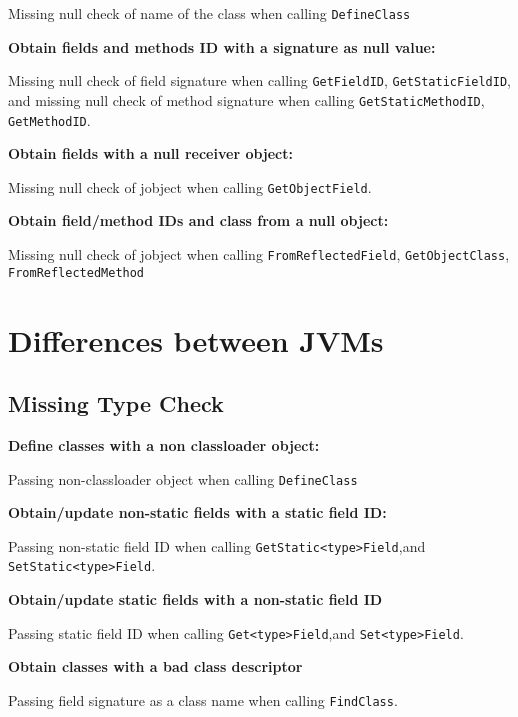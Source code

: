 \documentclass[10pt]{article}
\begin{document}
Missing null check of name of the class when calling {\tt DefineClass}

\vspace{3mm}
\noindent \textbf{Obtain fields and methods ID with a signature as null value:}

Missing null check of field signature when calling {\tt GetFieldID}, {\tt GetStaticFieldID}, and
missing null check of method signature when calling {\tt GetStaticMethodID}, {\tt GetMethodID}.

\vspace{3mm}
\noindent \textbf{Obtain fields with a null receiver object:}

Missing null check of jobject when calling {\tt GetObjectField}.

\vspace{3mm}
\noindent \textbf{Obtain field/method IDs and class from a null object:}

Missing null check of jobject when calling {\tt FromReflectedField}, {\tt GetObjectClass}, {\tt FromReflectedMethod}


\section{Differences between JVMs}
\subsection{Missing Type Check}

\vspace{3mm}
\noindent \textbf{Define classes with a non classloader object:}

Passing non-classloader object when calling {\tt DefineClass}

\vspace{3mm}
\noindent \textbf{Obtain/update non-static fields with a static field ID:}

Passing non-static field ID when calling {\tt GetStatic<type>Field},and {\tt SetStatic<type>Field}.

\vspace{3mm}
\noindent \textbf{Obtain/update static fields with a non-static field ID}

Passing static field ID when calling {\tt Get<type>Field},and {\tt Set<type>Field}.

\vspace{3mm}
\noindent \textbf{Obtain classes with a bad class descriptor}

Passing field signature as a class name when calling {\tt FindClass}.
\end{document}
